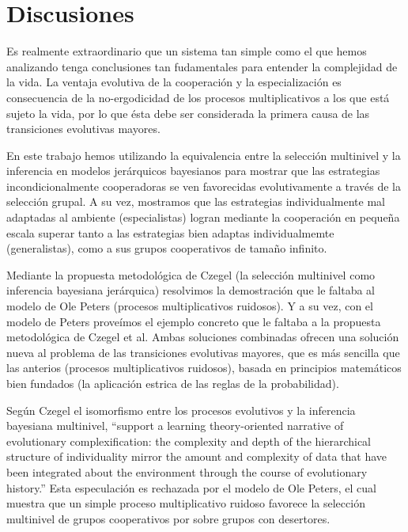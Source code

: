 \documentclass[a4paper,10pt]{article}
\begin{document}
\section{Discusiones}

Es realmente extraordinario que un sistema tan simple como el que hemos analizando tenga conclusiones tan fudamentales para entender la complejidad de la vida.
La ventaja evolutiva de la cooperación y la especialización es consecuencia de la no-ergodicidad de los procesos multiplicativos a los que está sujeto la vida, por lo que ésta debe ser considerada la primera causa de las transiciones evolutivas mayores.

En este trabajo hemos utilizando la equivalencia entre la selección multinivel y la inferencia en modelos jerárquicos bayesianos para mostrar que las estrategias incondicionalmente cooperadoras se ven favorecidas evolutivamente a través de la selección grupal.
A su vez, mostramos que las estrategias individualmente mal adaptadas al ambiente (especialistas) logran mediante la cooperación en pequeña escala superar tanto a las estrategias bien adaptas individualmemte (generalistas), como a sus grupos cooperativos de tamaño infinito.

Mediante la propuesta metodológica de Czegel \cite{czegel2019-bayesianEvolution} (la selección multinivel como inferencia bayesiana jerárquica) resolvimos la demostración que le faltaba al modelo de Ole Peters (procesos multiplicativos ruidosos).
Y a su vez, con el modelo de Peters proveímos el ejemplo concreto que le faltaba a la propuesta metodológica de Czegel et al.
Ambas soluciones combinadas ofrecen una solución nueva al problema de las transiciones evolutivas mayores, que es más sencilla que las anterios (procesos multiplicativos ruidosos), basada en principios matemáticos bien fundados (la aplicación estrica de las reglas de la probabilidad).

Según Czegel \cite{czegel2019-bayesianEvolution} el isomorfismo entre los procesos evolutivos y la inferencia bayesiana multinivel,  ``support a learning theory-oriented narrative of evolutionary complexification: the complexity and depth of the hierarchical structure of individuality mirror the amount and complexity of data that have been integrated about the environment through the course of evolutionary history.''
Esta especulación es rechazada por el modelo de Ole Peters, el cual muestra que un simple proceso multiplicativo ruidoso favorece la selección multinivel de grupos cooperativos por sobre grupos con desertores.
\end{document}
